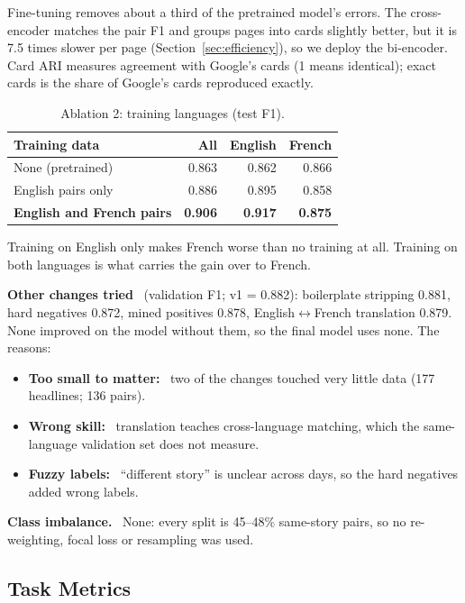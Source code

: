 \documentclass[11pt,letterpaper]{article}
\newcommand{\lead}[1]{\textbf{#1}~}
\begin{document}
Fine-tuning removes about a third of the pretrained model's errors. The cross-encoder matches the pair F1 and groups pages into cards slightly better, but it is 7.5 times slower per page (Section~\ref{sec:efficiency}), so we deploy the bi-encoder. Card ARI measures agreement with Google's cards (1 means identical); exact cards is the share of Google's cards reproduced exactly.

\begin{table}[H]
\centering\small
\begin{tabular}{lrrr}
\toprule
Training data & All & English & French \\
\midrule
None (pretrained) & 0.863 & 0.862 & 0.866 \\
English pairs only & 0.886 & 0.895 & 0.858 \\
\textbf{English and French pairs} & \textbf{0.906} & \textbf{0.917} & \textbf{0.875} \\
\bottomrule
\end{tabular}
\caption{Ablation 2: training languages (test F1).}
\end{table}

Training on English only makes French worse than no training at all. Training on both languages is what carries the gain over to French.

\lead{Other changes tried} (validation F1; v1 = 0.882): boilerplate stripping 0.881, hard negatives 0.872, mined positives 0.878, English$\leftrightarrow$French translation 0.879. None improved on the model without them, so the final model uses none. The reasons:
\begin{itemize}
\item \lead{Too small to matter:} two of the changes touched very little data (177 headlines; 136 pairs).
\item \lead{Wrong skill:} translation teaches cross-language matching, which the same-language validation set does not measure.
\item \lead{Fuzzy labels:} ``different story'' is unclear across days, so the hard negatives added wrong labels.
\end{itemize}

\lead{Class imbalance.} None: every split is 45--48\% same-story pairs, so no re-weighting, focal loss or resampling was used.

\subsection{Task Metrics}
\end{document}
